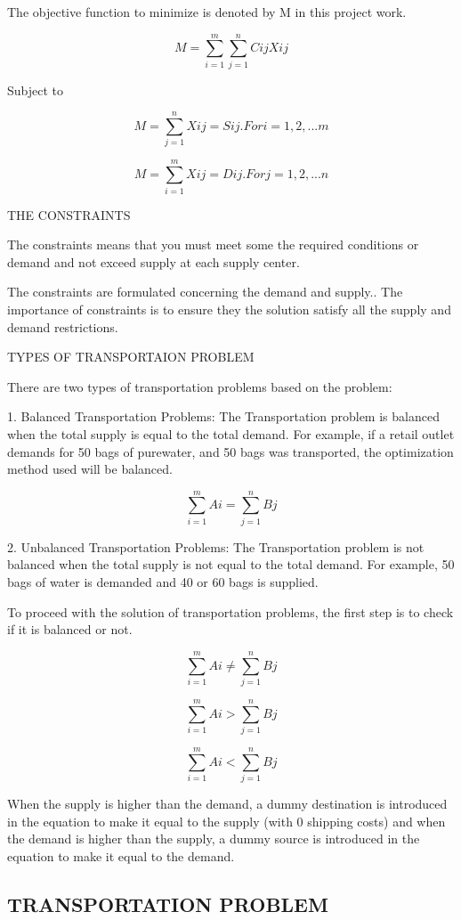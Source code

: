 \documentclass{article}
\begin{document}
{The objective function to minimize is denoted by M in this project work.

 \[M = \sum_{i=1}^{m} \sum_{j=1}^{n} Cij Xij \]
 
Subject to

 \[M = \sum_{j=1}^{n} Xij = Sij. For  i = 1, 2, ...m \]

 \[M = \sum_{i=1}^{m} Xij = Dij. For j = 1, 2, ...n\] 

THE CONSTRAINTS

The constraints means that you must meet some the required conditions or demand and not exceed supply at each supply center.

The constraints are formulated concerning the demand and supply.. The importance of constraints is to ensure they the solution satisfy all the supply and demand restrictions. \break

TYPES OF TRANSPORTAION PROBLEM

There are two  types of transportation problems based on the problem:

1. Balanced Transportation Problems: The Transportation problem is balanced when the total supply is equal to the total demand. For example, if a retail outlet demands for 50 bags of purewater, and 50 bags was transported, the optimization method used will be balanced.

\[\sum_{i=1}^{m} Ai = \sum_{j=1}^{n}Bj \]


2. Unbalanced Transportation Problems: The Transportation problem is not balanced when the total supply is not equal to the total demand. For example, 50 bags of water is demanded and 40 or 60 bags is supplied.

To proceed with the solution of transportation problems, the first step is to check if it is balanced or not.

\[\sum_{i=1}^{m} Ai \neq \sum_{j=1}^{n}Bj \]

\[\sum_{i=1}^{m} Ai > \sum_{j=1}^{n}Bj \]

\[\sum_{i=1}^{m} Ai < \sum_{j=1}^{n}Bj \]

When the supply is higher than the demand, a dummy destination is introduced in the equation to make it equal to the supply (with 0 shipping costs) and when the demand is higher than the supply, a dummy source is introduced in the equation to make it equal to the demand.}	


\newpage

\begin{center}
	\section{TRANSPORTATION PROBLEM}
\end{center}
\end{document}
